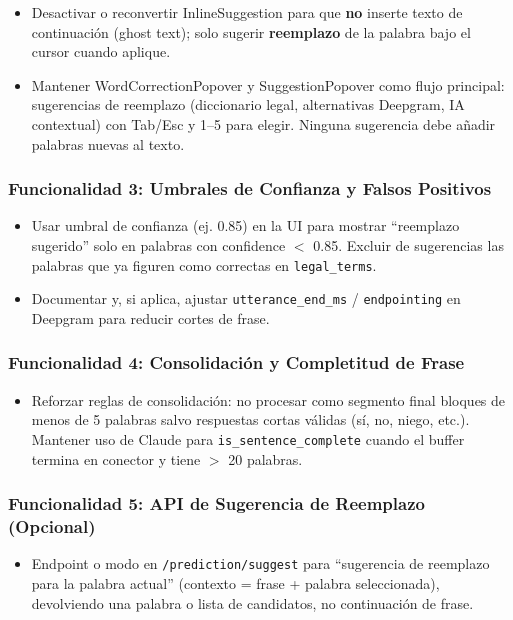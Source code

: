 \documentclass[12pt,a4paper]{report}
\begin{document}
\begin{itemize}
    \item Desactivar o reconvertir InlineSuggestion para que \textbf{no} inserte texto de continuación (ghost text); solo sugerir \textbf{reemplazo} de la palabra bajo el cursor cuando aplique.
    \item Mantener WordCorrectionPopover y SuggestionPopover como flujo principal: sugerencias de reemplazo (diccionario legal, alternativas Deepgram, IA contextual) con Tab/Esc y 1--5 para elegir. Ninguna sugerencia debe añadir palabras nuevas al texto.
\end{itemize}

\subsubsection{Funcionalidad 3: Umbrales de Confianza y Falsos Positivos}

\begin{itemize}
    \item Usar umbral de confianza (ej. 0.85) en la UI para mostrar ``reemplazo sugerido'' solo en palabras con confidence $<$ 0.85. Excluir de sugerencias las palabras que ya figuren como correctas en \texttt{legal\_terms}.
    \item Documentar y, si aplica, ajustar \texttt{utterance\_end\_ms} / \texttt{endpointing} en Deepgram para reducir cortes de frase.
\end{itemize}

\subsubsection{Funcionalidad 4: Consolidación y Completitud de Frase}

\begin{itemize}
    \item Reforzar reglas de consolidación: no procesar como segmento final bloques de menos de 5 palabras salvo respuestas cortas válidas (sí, no, niego, etc.). Mantener uso de Claude para \texttt{is\_sentence\_complete} cuando el buffer termina en conector y tiene $>$ 20 palabras.
\end{itemize}

\subsubsection{Funcionalidad 5: API de Sugerencia de Reemplazo (Opcional)}

\begin{itemize}
    \item Endpoint o modo en \texttt{/prediction/suggest} para ``sugerencia de reemplazo para la palabra actual'' (contexto = frase + palabra seleccionada), devolviendo una palabra o lista de candidatos, no continuación de frase.
\end{itemize}
\end{document}
